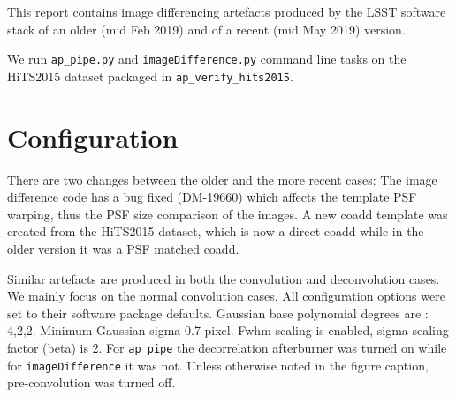 \documentclass{article}
\begin{document}
This report contains image differencing artefacts produced by the LSST
software stack of an older (mid Feb 2019) and of a recent  (mid May 2019)
version. 

We run \texttt{ap\_pipe.py} and \texttt{imageDifference.py} command
line tasks on the HiTS2015 dataset packaged in \texttt{ap\_verify\_hits2015}.

\section{Configuration}
There are two changes between the older and the more recent cases:
The image difference code has a bug fixed (DM-19660) which affects the
template PSF warping, thus the PSF size comparison of the images.
A new coadd template was created from the HiTS2015
dataset, which is now a direct coadd while in the older version it was
a PSF matched coadd.

Similar artefacts are produced in both the convolution and
deconvolution cases. We mainly focus on the normal convolution cases.
All configuration options were set to their software package defaults.
Gaussian base polynomial degrees are : 4,2,2. Minimum Gaussian sigma
0.7 pixel.  Fwhm scaling is enabled, sigma scaling factor (beta) is
2. For \texttt{ap\_pipe} the decorrelation afterburner was turned on
while for \texttt{imageDifference} it was not.  Unless otherwise noted
in the figure caption, pre-convolution was turned off.
%
\end{document}

